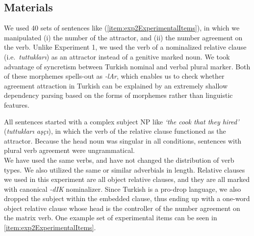 \documentclass[
  english,
  doc,floatsintext]{apa6}
\begin{document}
\hypertarget{materials-1}{%
\subsection{Materials}\label{materials-1}}

We used 40 sets of sentences like
(\ref{item:exp2ExperimentalItems}), in which we manipulated
(i) the number of the attractor, and
(ii) the number agreement on the verb.
Unlike Experiment 1, we used the verb of a nominalized relative clause (i.e.~\textit{tuttukları}) as an attractor instead of a genitive marked noun.
We took advantage of syncretism between Turkish nominal and verbal plural marker. Both of these morphemes spells-out as \textit{-lAr}, which enables us to check whether agreement attraction in Turkish can be explained by an extremely shallow dependency parsing based on the forms of morphemes rather than linguistic features.

All sentences started with a complex subject NP like \textit{`the cook that they hired'} (\textit{tuttukları aşçı}), in which the verb of the relative clause functioned as the attractor. Because the head noun was singular in all conditions, sentences with plural verb agreement were ungrammatical.\\
We have used the same verbs, and have not changed the distribution of verb types. We also utilized the same or similar adverbials in length.
Relative clauses we used in this experiment are all object relative clauses, and they are all marked with canonical \textit{-dIK} nominalizer. Since Turkish is a pro-drop language, we also dropped the subject within the embedded clause, thus ending up with a one-word object relative clause whose head is the controller of the number agreement on the matrix verb. One example set of experimental items can be seen in \ref{item:exp2ExperimentalItems}.
\end{document}
